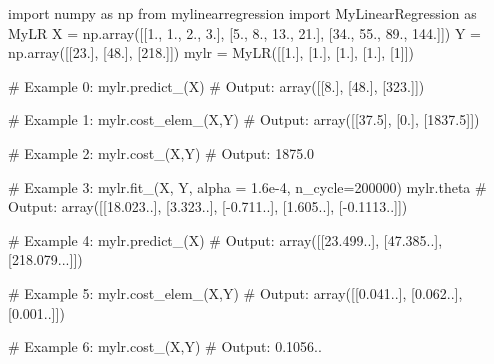\documentclass[]{article}
\newenvironment{Shaded}{\begin{snugshade}}{\end{snugshade}}
\newcommand{\CommentTok}[1]{\textcolor[rgb]{0.48,0.49,0.49}{#1}}
\newcommand{\DecValTok}[1]{\textcolor[rgb]{0.96,0.45,0.00}{#1}}
\newcommand{\FloatTok}[1]{\textcolor[rgb]{0.96,0.45,0.00}{#1}}
\newcommand{\ImportTok}[1]{\textcolor[rgb]{0.15,0.68,0.38}{#1}}
\newcommand{\NormalTok}[1]{\textcolor[rgb]{0.81,0.81,0.76}{#1}}
\newcommand{\OperatorTok}[1]{\textcolor[rgb]{0.81,0.81,0.76}{#1}}
\begin{document}
\begin{Shaded}
\begin{Highlighting}[]
\ImportTok{import}\NormalTok{ numpy }\ImportTok{as}\NormalTok{ np}
\ImportTok{from}\NormalTok{ mylinearregression }\ImportTok{import}\NormalTok{ MyLinearRegression }\ImportTok{as}\NormalTok{ MyLR}
\NormalTok{X }\OperatorTok{=}\NormalTok{ np.array([[}\FloatTok{1.}\NormalTok{, }\FloatTok{1.}\NormalTok{, }\FloatTok{2.}\NormalTok{, }\FloatTok{3.}\NormalTok{], [}\FloatTok{5.}\NormalTok{, }\FloatTok{8.}\NormalTok{, }\FloatTok{13.}\NormalTok{, }\FloatTok{21.}\NormalTok{], [}\FloatTok{34.}\NormalTok{, }\FloatTok{55.}\NormalTok{, }\FloatTok{89.}\NormalTok{, }\FloatTok{144.}\NormalTok{]])}
\NormalTok{Y }\OperatorTok{=}\NormalTok{ np.array([[}\FloatTok{23.}\NormalTok{], [}\FloatTok{48.}\NormalTok{], [}\FloatTok{218.}\NormalTok{]])}
\NormalTok{mylr }\OperatorTok{=}\NormalTok{ MyLR([[}\FloatTok{1.}\NormalTok{], [}\FloatTok{1.}\NormalTok{], [}\FloatTok{1.}\NormalTok{], [}\FloatTok{1.}\NormalTok{], [}\DecValTok{1}\NormalTok{]])}

\CommentTok{# Example 0:}
\NormalTok{mylr.predict_(X)}
\CommentTok{# Output:}
\NormalTok{array([[}\FloatTok{8.}\NormalTok{], [}\FloatTok{48.}\NormalTok{], [}\FloatTok{323.}\NormalTok{]])}

\CommentTok{# Example 1:}
\NormalTok{mylr.cost_elem_(X,Y)}
\CommentTok{# Output:}
\NormalTok{array([[}\FloatTok{37.5}\NormalTok{], [}\FloatTok{0.}\NormalTok{], [}\FloatTok{1837.5}\NormalTok{]])}

\CommentTok{# Example 2:}
\NormalTok{mylr.cost_(X,Y)}
\CommentTok{# Output:}
\FloatTok{1875.0}

\CommentTok{# Example 3:}
\NormalTok{mylr.fit_(X, Y, alpha }\OperatorTok{=} \FloatTok{1.6e-4}\NormalTok{, n_cycle}\OperatorTok{=}\DecValTok{200000}\NormalTok{)}
\NormalTok{mylr.theta}
\CommentTok{# Output:}
\NormalTok{array([[}\DecValTok{18}\NormalTok{.}\DecValTok{023}\NormalTok{..], [}\DecValTok{3}\NormalTok{.}\DecValTok{323}\NormalTok{..], [}\OperatorTok{-}\DecValTok{0}\NormalTok{.}\DecValTok{711}\NormalTok{..], [}\DecValTok{1}\NormalTok{.}\DecValTok{605}\NormalTok{..], [}\OperatorTok{-}\DecValTok{0}\NormalTok{.}\DecValTok{1113}\NormalTok{..]])}

\CommentTok{# Example 4:}
\NormalTok{mylr.predict_(X)}
\CommentTok{# Output:}
\NormalTok{array([[}\DecValTok{23}\NormalTok{.}\DecValTok{499}\NormalTok{..], [}\DecValTok{47}\NormalTok{.}\DecValTok{385}\NormalTok{..], [}\DecValTok{218}\NormalTok{.}\DecValTok{079}\NormalTok{...]])}

\CommentTok{# Example 5:}
\NormalTok{mylr.cost_elem_(X,Y)}
\CommentTok{# Output:}
\NormalTok{array([[}\DecValTok{0}\NormalTok{.}\DecValTok{041}\NormalTok{..], [}\DecValTok{0}\NormalTok{.}\DecValTok{062}\NormalTok{..], [}\DecValTok{0}\NormalTok{.}\DecValTok{001}\NormalTok{..]])}

\CommentTok{# Example 6:}
\NormalTok{mylr.cost_(X,Y)}
\CommentTok{# Output:}
\DecValTok{0}\NormalTok{.}\DecValTok{1056}\NormalTok{..}
\end{Highlighting}
\end{Shaded}
\end{document}

